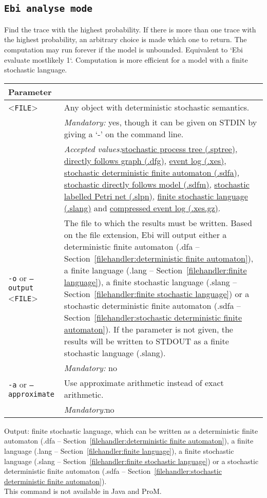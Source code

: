{\subsection{\texttt{Ebi analyse mode}}
\label{command:Ebi analyse mode}
Find the trace with the highest probability.
If there is more than one trace with the highest probability, an arbitrary choice is made which one to return.
The computation may run forever if the model is unbounded.
Equivalent to `Ebi evaluate mostlikely 1`.
Computation is more efficient for a model with a finite stochastic language.\\
\begin{tabularx}{\linewidth}{lX}
\toprule
Parameter \\\midrule
<\texttt{FILE}>&Any object with deterministic stochastic semantics.\\
&\textit{Mandatory:} \quad yes, though it can be given on STDIN by giving a `-' on the command line.\\
&\textit{Accepted values:}\quad \hyperref[filehandler:stochastic process tree]{stochastic process tree (.sptree)}, \hyperref[filehandler:directly follows graph]{directly follows graph (.dfg)}, \hyperref[filehandler:event log]{event log (.xes)}, \hyperref[filehandler:stochastic deterministic finite automaton]{stochastic deterministic finite automaton (.sdfa)}, \hyperref[filehandler:stochastic directly follows model]{stochastic directly follows model (.sdfm)}, \hyperref[filehandler:stochastic labelled Petri net]{stochastic labelled Petri net (.slpn)}, \hyperref[filehandler:finite stochastic language]{finite stochastic language (.slang)} and \hyperref[filehandler:compressed event log]{compressed event log (.xes.gz)}.\\
\texttt{-o} or \texttt{--output} <\texttt{FILE}> &
The file to which the results must be written. Based on the file extension, Ebi will output either a deterministic finite automaton (.dfa -- Section~\ref{filehandler:deterministic finite automaton}), a finite language (.lang -- Section~\ref{filehandler:finite language}), a finite stochastic language (.slang -- Section~\ref{filehandler:finite stochastic language}) or a stochastic deterministic finite automaton (.sdfa -- Section~\ref{filehandler:stochastic deterministic finite automaton}).
If the parameter is not given, the results will be written to STDOUT as a finite stochastic language (.slang).\\
&\textit{Mandatory:} \quad no\\
\texttt{-a} or \texttt{--approximate} & Use approximate arithmetic instead of exact arithmetic.\\
&\textit{Mandatory:}\quad no\\
\bottomrule
\end{tabularx}
\noindent Output: finite stochastic language, which can be written as a deterministic finite automaton (.dfa -- Section~\ref{filehandler:deterministic finite automaton}), a finite language (.lang -- Section~\ref{filehandler:finite language}), a finite stochastic language (.slang -- Section~\ref{filehandler:finite stochastic language}) or a stochastic deterministic finite automaton (.sdfa -- Section~\ref{filehandler:stochastic deterministic finite automaton}).
\\This command is not available in Java and ProM.
}
